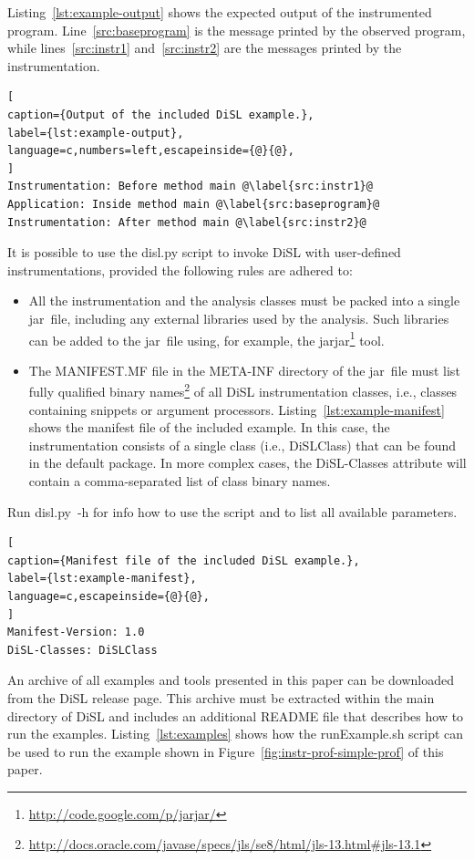 \documentclass{article}
\newcommand{\brcode}[1]{\textsf{#1}}
\newcommand{\code}[1]{\mbox{\brcode{#1}}}
\begin{document}
\medskip
Listing~\ref{lst:example-output} shows the expected output of the instrumented program.
Line~\ref{src:baseprogram} is the message printed by the observed program, while lines~\ref{src:instr1} and~\ref{src:instr2} are the messages printed by the instrumentation.

\begin{lstlisting}[
caption={Output of the included DiSL example.},
label={lst:example-output},
language=c,numbers=left,escapeinside={@}{@},
]
Instrumentation: Before method main @\label{src:instr1}@
Application: Inside method main @\label{src:baseprogram}@
Instrumentation: After method main @\label{src:instr2}@
\end{lstlisting}


\medskip
It is possible to use the \code{disl.py} script to invoke DiSL with user-defined instrumentations, provided the following rules are adhered to:
\begin{itemize}
\item All the instrumentation and the analysis classes must be packed into a single jar~file, including any external libraries used by the analysis.
Such libraries can be added to the jar~file using, for example, the \code{jarjar}\footnote{\url{http://code.google.com/p/jarjar/}} tool.

\item The \code{MANIFEST.MF} file in the \code{META-INF} directory of the jar~file must list fully qualified binary names\footnote{\url{http://docs.oracle.com/javase/specs/jls/se8/html/jls-13.html\#jls-13.1}} of all DiSL instrumentation classes, i.e., classes containing snippets or argument processors.
Listing~\ref{lst:example-manifest} shows the manifest file of the included example.
In this case, the instrumentation consists of a single class (i.e., \code{DiSLClass}) that can be found in the default package.
In more complex cases, the \code{DiSL-Classes} attribute will contain a comma-separated list of class binary names.
\end{itemize}

Run \code{disl.py -h} for info how to use the script and to list all available parameters.

\begin{lstlisting}[
caption={Manifest file of the included DiSL example.},
label={lst:example-manifest},
language=c,escapeinside={@}{@},
]
Manifest-Version: 1.0
DiSL-Classes: DiSLClass
\end{lstlisting}


\medskip
An archive of all examples and tools presented in this paper can be downloaded from the DiSL release page.
This archive must be extracted within the main directory of DiSL and includes an additional \code{README} file that describes how to run the examples.
Listing~\ref{lst:examples} shows how the \code{runExample.sh} script can be used to run the example shown in Figure~\ref{fig:instr-prof-simple-prof} of this paper.
\end{document}
